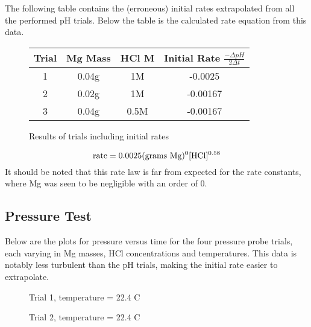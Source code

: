 \documentclass[12pt, letterpaper]{article}
\begin{document}
The following table contains the (erroneous) initial rates extrapolated from all the performed pH trials. Below the table is the calculated rate equation from this data.
\FloatBarrier
\begin{figure}[h!]
	\begin{center}
	\renewcommand\arraystretch{1.5}
	\renewcommand\tabcolsep{12pt}
		\begin{tabular}{|c|c|c|c|}
			\hline 
			Trial & Mg Mass & HCl M & Initial Rate $\frac{-\Delta pH}{2 \Delta t}$\\
			\hline 
			1 & 0.04g & 1M & -0.0025\\
	 		\hline
			2 & 0.02g & 1M & -0.00167\\
	 		\hline
			3 & 0.04g & 0.5M & -0.00167\\
	 		\hline			 			 		
		\end{tabular}
	\end{center}
	\label{fig:pHtab}
	\caption{Results of trials including initial rates}
\end{figure}
\FloatBarrier

\begin{equation}
\textnormal{rate}  = 0.0025 (\textnormal{grams Mg})^0 [\textnormal{HCl}]^{0.58}
\label{eq:pHrate}
\end{equation}
It should be noted that this rate law is far from expected for the rate constants, where Mg was seen to be negligible with an order of 0. 


\subsection{Pressure Test}
Below are the plots for pressure versus time for the four pressure probe trials, each varying in Mg masses, HCl concentrations and temperatures. This data is notably less turbulent than the pH trials, making the initial rate easier to extrapolate.
\FloatBarrier
\begin{figure}[h!]
\centering
\begin{minipage}{0.5\textwidth}
		\raggedright
	   	\resizebox{0.9\textwidth}{!}{}
  \caption{Trial 1, temperature = 22.4 \textdegree C}%
\label{fig:1m4}%
\end{minipage}%
\hfill%
\begin{minipage}{0.5\textwidth}%
		\raggedleft
    	\resizebox{0.9\textwidth}{!}{}
  \caption{Trial 2, temperature = 22.4 \textdegree C }
\label{fig:1m2}
\end {minipage}
\end {figure}
\FloatBarrier
\end{document}
